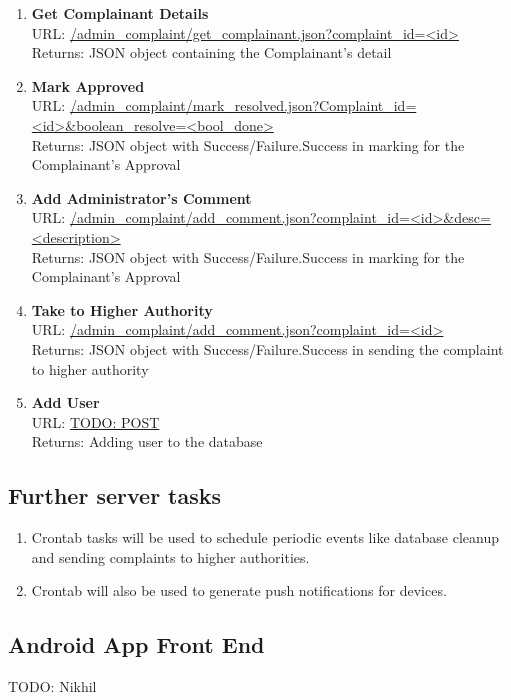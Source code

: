 \documentclass{article}
\begin{document}
\begin{enumerate}
					\item \textbf{Get Complainant Details} \\
						URL: \url{/admin_complaint/get_complainant.json?complaint_id=<id>}\\
						Returns: JSON object containing the Complainant's detail
					\item \textbf{Mark Approved} \\
						URL: \url{/admin_complaint/mark_resolved.json?Complaint_id=<id>&boolean_resolve=<bool_done>}\\
						Returns: JSON object with Success/Failure.Success in marking for the Complainant's Approval
					\item \textbf{Add Administrator's Comment} \\ 
						URL: \url{/admin_complaint/add_comment.json?complaint_id=<id>&desc=<description>}\\
						Returns: JSON object with Success/Failure.Success in marking for the Complainant's Approval
					\item \textbf{Take to Higher Authority} \\ 
						URL: \url{/admin_complaint/add_comment.json?complaint_id=<id>}\\
						Returns: JSON object with Success/Failure.Success in sending the complaint to higher authority
					\item \textbf{Add User} \\ 
						URL: \url{TODO: POST}\\
						Returns: Adding user to the database 
				\end{enumerate}
			\subsection{Further server tasks}
				\begin{enumerate}
					\item Crontab tasks will be used to schedule periodic events like database cleanup and sending complaints to higher authorities.
					\item Crontab will also be used to generate push notifications for devices.
				\end{enumerate}
			\subsection{Android App Front End}
				TODO: Nikhil
\end{document}
